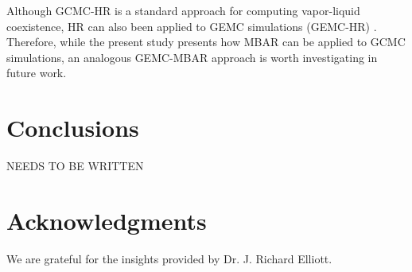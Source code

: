 \documentclass[journal=jced,manuscript=article]{achemso}
\begin{document}
Although GCMC-HR is a standard approach for computing vapor-liquid coexistence, HR can also been applied to GEMC simulations (GEMC-HR) \cite{Boulougouris2010}. Therefore, while the present study presents how MBAR can be applied to GCMC simulations, an analogous GEMC-MBAR approach is worth investigating in future work.

%

\section{Conclusions} \label{sec: Conclusions}

NEEDS TO BE WRITTEN

\section{Acknowledgments}

We are grateful for the insights provided by Dr. J. Richard Elliott.



%
%
%
%
%
%
\end{document}
